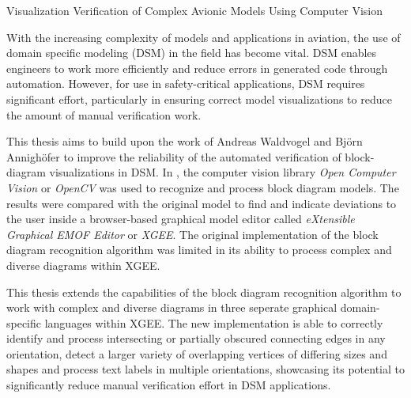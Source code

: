 \label{abstract}
{\LARGE Visualization Verification of Complex Avionic Models Using Computer Vision}

With the increasing complexity of models and applications in aviation, the use of domain specific modeling (DSM) in the field has become vital. DSM enables engineers to work more efficiently and reduce errors in generated code through automation. However, for use in safety-critical applications, DSM requires significant effort, particularly in ensuring correct model visualizations to reduce the amount of manual verification work.

This thesis aims to build upon the work of Andreas Waldvogel and Björn Annighöfer \cite{og_paper} to improve the reliability of the automated verification of block-diagram visualizations in DSM. In \cite{og_paper}, the computer vision library \textit{Open Computer Vision} or \textit{OpenCV} was used to recognize and process block diagram models. The results were compared with the original model to find and indicate deviations to the user inside a browser-based graphical model editor called \textit{eXtensible Graphical EMOF Editor} or \textit{XGEE}.
The original implementation of the block diagram recognition algorithm was limited in its ability to process complex and diverse diagrams within XGEE.

This thesis extends the capabilities of the block diagram recognition algorithm to work with complex and diverse diagrams in three seperate graphical domain-specific languages within XGEE. The new implementation is able to correctly identify and process intersecting or partially obscured connecting edges in any orientation, detect a larger variety of overlapping vertices of differing sizes and shapes and process text labels in multiple orientations, showcasing its potential to significantly reduce manual verification effort in DSM applications.